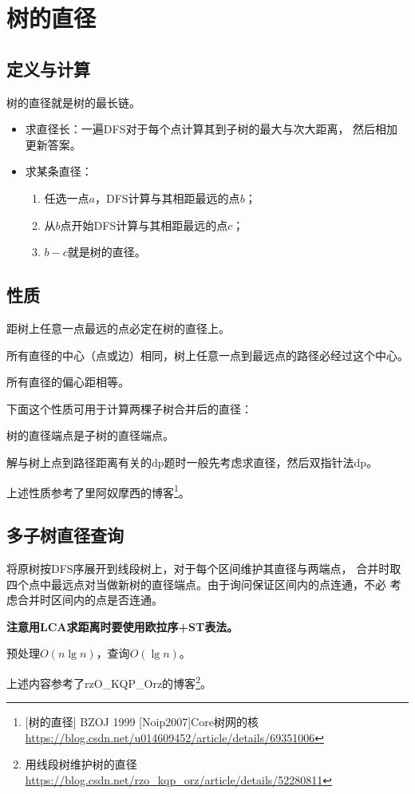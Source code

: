 \section{树的直径}
\subsection{定义与计算}
树的直径就是树的最长链。

\begin{itemize}
    \item 求直径长：一遍DFS对于每个点计算其到子树的最大与次大距离，
    然后相加更新答案。
    \item
    求某条直径：
    \begin{enumerate}
        \item 任选一点$a$，DFS计算与其相距最远的点$b$；
        \item 从$b$点开始DFS计算与其相距最远的点$c$；
        \item $b-c$就是树的直径。
    \end{enumerate}
\end{itemize}

\subsection{性质}

\begin{property}
    距树上任意一点最远的点必定在树的直径上。
\end{property}

\begin{property}
    所有直径的中心（点或边）相同，树上任意一点到最远点的路径必经过这个中心。
\end{property}

\begin{property}
    所有直径的偏心距相等。
\end{property}

下面这个性质可用于计算两棵子树合并后的直径：
\begin{property}
    树的直径端点是子树的直径端点。
\end{property}

解与树上点到路径距离有关的dp题时一般先考虑求直径，然后双指针法dp。

上述性质参考了里阿奴摩西的博客\footnote{[树的直径] BZOJ 1999 [Noip2007]Core树网的核
\url{https://blog.csdn.net/u014609452/article/details/69351006}}。

\subsection{多子树直径查询}
将原树按DFS序展开到线段树上，对于每个区间维护其直径与两端点，
合并时取四个点中最远点对当做新树的直径端点。由于询问保证区间内的点连通，不必
考虑合并时区间内的点是否连通。

{\bfseries 注意用LCA求距离时要使用欧拉序+ST表法。}

预处理$O(n\lg n)$，查询$O(\lg n)$。

上述内容参考了rzO\_KQP\_Orz的博客\footnote{用线段树维护树的直径
\url{https://blog.csdn.net/rzo\_kqp\_orz/article/details/52280811}
}。
